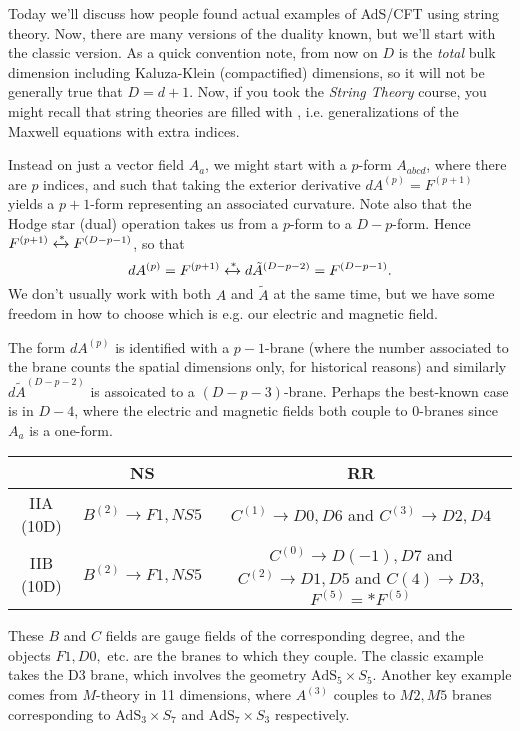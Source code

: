 Today we'll discuss how people found actual examples of AdS/CFT using string theory. Now, there are many versions of the duality known, but we'll start with the classic version. As a quick convention note, from now on $D$ is the \emph{total} bulk dimension including Kaluza-Klein (compactified) dimensions, so it will not be generally true that $D=d+1$. Now, if you took the \emph{String Theory} course, you might recall that string theories are filled with , i.e. generalizations of the Maxwell equations with extra indices. 

Instead on just a vector field $A_a$, we might start with a $p$-form $A_{abcd}$, where there are $p$ indices, and such that taking the exterior derivative $dA^{(p)}=F^{(p+1)}$ yields a $p+1$-form representing an associated curvature. Note also that the Hodge star (dual) operation takes us from a $p$-form to a $D-p$-form. Hence $F^{(p+1)}\xleftrightarrow{*}F^{(D-p-1)}$, so that
\begin{equation}
    dA^{(p)}=F^{(p+1)}\xleftrightarrow{*}d\tilde A^{(D-p-2)} = F^{(D-p-1)}.
\end{equation}
We don't usually work with both $A$ and $\tilde A$ at the same time, but we have some freedom in how to choose which is e.g. our electric and magnetic field.

The form $dA^{(p)}$ is identified with a $p-1$-brane (where the number associated to the brane counts the spatial dimensions only, for historical reasons) and similarly $d\tilde A^{(D-p-2)}$ is assoicated to a $(D-p-3)$-brane. Perhaps the best-known case is in $D-4$, where the electric and magnetic fields both couple to $0$-branes since $A_a$ is a one-form.

\begin{center}
    \begin{tabular}{c|c|c}
        & NS & RR \\\hline
        IIA (10D) & $B^{(2)} \to F1,NS5$ & $C^{(1)}\to D0,D6$ and $C^{(3)} \to D2,D4$\\
        IIB (10D) & $B^{(2)} \to F1,NS5$ & $C^{(0)} \to D(-1),D7$ and $C^{(2)}\to D1,D5$ and $C{(4)}\to D3$, $F^{(5)}= * F^{(5)}$
    \end{tabular}
\end{center}

These $B$ and $C$ fields are gauge fields of the corresponding degree, and the objects $F1,D0,$ etc. are the branes to which they couple. The classic example takes the D3 brane, which involves the geometry $\text{AdS}_5\times S_5$. Another key example comes from $M$-theory in 11 dimensions, where $A^{(3)}$ couples to $M2,M5$ branes corresponding to $\text{AdS}_3\times S_7$ and $\text{AdS}_7\times S_3$ respectively.

